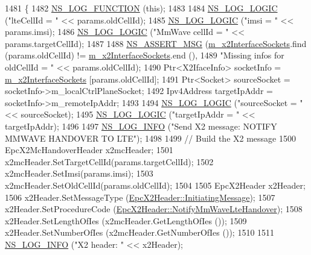 \begin{DoxyCode}
1481 \{
1482   \hyperlink{log-macros-disabled_8h_a90b90d5bad1f39cb1b64923ea94c0761}{NS\_LOG\_FUNCTION} (\textcolor{keyword}{this});
1483 
1484   \hyperlink{group__logging_ga88acd260151caf2db9c0fc84997f45ce}{NS\_LOG\_LOGIC} (\textcolor{stringliteral}{"lteCellId = "} << params.oldCellId);
1485   \hyperlink{group__logging_ga88acd260151caf2db9c0fc84997f45ce}{NS\_LOG\_LOGIC} (\textcolor{stringliteral}{"imsi = "} << params.imsi);
1486   \hyperlink{group__logging_ga88acd260151caf2db9c0fc84997f45ce}{NS\_LOG\_LOGIC} (\textcolor{stringliteral}{"MmWave cellId = "} << params.targetCellId);
1487 
1488   \hyperlink{assert_8h_aff5ece9066c74e681e74999856f08539}{NS\_ASSERT\_MSG} (\hyperlink{classns3_1_1EpcX2_a0665276228b9b99a52ef6d5e9bdb306d}{m\_x2InterfaceSockets}.find (params.oldCellId) != 
      \hyperlink{classns3_1_1EpcX2_a0665276228b9b99a52ef6d5e9bdb306d}{m\_x2InterfaceSockets}.end (),
1489                  \textcolor{stringliteral}{"Missing infos for oldCellId = "} << params.oldCellId);
1490   Ptr<X2IfaceInfo> socketInfo = \hyperlink{classns3_1_1EpcX2_a0665276228b9b99a52ef6d5e9bdb306d}{m\_x2InterfaceSockets} [params.oldCellId];
1491   Ptr<Socket> sourceSocket = socketInfo->m\_localCtrlPlaneSocket;
1492   Ipv4Address targetIpAddr = socketInfo->m\_remoteIpAddr;
1493 
1494   \hyperlink{group__logging_ga88acd260151caf2db9c0fc84997f45ce}{NS\_LOG\_LOGIC} (\textcolor{stringliteral}{"sourceSocket = "} << sourceSocket);
1495   \hyperlink{group__logging_ga88acd260151caf2db9c0fc84997f45ce}{NS\_LOG\_LOGIC} (\textcolor{stringliteral}{"targetIpAddr = "} << targetIpAddr);
1496 
1497   \hyperlink{group__logging_gafbd73ee2cf9f26b319f49086d8e860fb}{NS\_LOG\_INFO} (\textcolor{stringliteral}{"Send X2 message: NOTIFY MMWAVE HANDOVER TO LTE"});
1498 
1499   \textcolor{comment}{// Build the X2 message}
1500   EpcX2McHandoverHeader x2mcHeader;
1501   x2mcHeader.SetTargetCellId(params.targetCellId);
1502   x2mcHeader.SetImsi(params.imsi);
1503   x2mcHeader.SetOldCellId(params.oldCellId);
1504 
1505   EpcX2Header x2Header;
1506   x2Header.SetMessageType (\hyperlink{classns3_1_1EpcX2Header_a0e69b043a20eaee4c570f223f4eca715a5761e50c3c1918a44e3a5ebc86f17435}{EpcX2Header::InitiatingMessage});
1507   x2Header.SetProcedureCode (\hyperlink{classns3_1_1EpcX2Header_afd178c1ed3c47948c587955698a15b0dacda8cb8a58dac96f5ea9be813f3a42c0}{EpcX2Header::NotifyMmWaveLteHandover});
1508   x2Header.SetLengthOfIes (x2mcHeader.GetLengthOfIes ());
1509   x2Header.SetNumberOfIes (x2mcHeader.GetNumberOfIes ());
1510 
1511   \hyperlink{group__logging_gafbd73ee2cf9f26b319f49086d8e860fb}{NS\_LOG\_INFO} (\textcolor{stringliteral}{"X2 header: "} << x2Header);

\end{DoxyCode}
